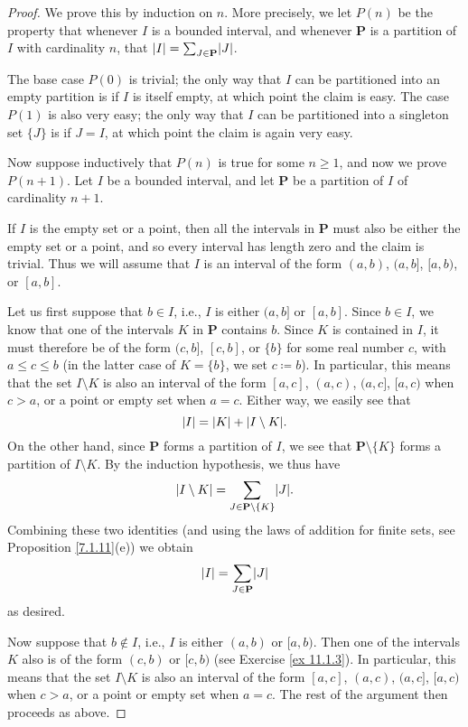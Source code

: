 \begin{proof}
    We prove this by induction on \(n\).
    More precisely, we let \(P(n)\) be the property that whenever \(I\) is a bounded interval, and whenever \(\mathbf{P}\) is a partition of \(I\) with cardinality \(n\), that \(\abs*{I} = \sum_{J \in \mathbf{P}} \abs*{J}\).

    The base case \(P(0)\) is trivial;
    the only way that \(I\) can be partitioned into an empty partition is if \(I\) is itself empty, at which point the claim is easy.
    The case \(P(1)\) is also very easy;
    the only way that \(I\) can be partitioned into a singleton set \(\{J\}\) is if \(J = I\), at which point the claim is again very easy.

    Now suppose inductively that \(P(n)\) is true for some \(n \geq 1\), and now we prove \(P(n + 1)\).
    Let \(I\) be a bounded interval, and let \(\mathbf{P}\) be a partition of \(I\) of cardinality \(n + 1\).

    If \(I\) is the empty set or a point, then all the intervals in \(\mathbf{P}\) must also be either the empty set or a point, and so every interval has length zero and the claim is trivial.
    Thus we will assume that \(I\) is an interval of the form \((a, b)\), \((a, b]\), \([a, b)\), or \([a, b]\).

            Let us first suppose that \(b \in I\), i.e., \(I\) is either \((a, b]\) or \([a, b]\).
    Since \(b \in I\), we know that one of the intervals \(K\) in \(\mathbf{P}\) contains \(b\).
    Since \(K\) is contained in \(I\), it must therefore be of the form \((c, b]\), \([c, b]\), or \(\{b\}\) for some real number \(c\), with \(a \leq c \leq b\) (in the latter case of \(K = \{b\}\), we set \(c \coloneqq b\)).
    In particular, this means that the set \(I \setminus K\) is also an interval of the form \([a, c]\), \((a, c)\), \((a, c]\), \([a, c)\) when \(c > a\), or a point or empty set when \(a = c\).
    Either way, we easily see that
    \[
        \abs*{I} = \abs*{K} + \abs*{I \setminus K}.
    \]
    On the other hand, since \(\mathbf{P}\) forms a partition of \(I\), we see that \(\mathbf{P} \setminus \{K\}\) forms a partition of \(I \setminus K\).
    By the induction hypothesis, we thus have
    \[
        \abs*{I \setminus K} = \sum_{J \in \mathbf{P} \setminus \{K\}} \abs*{J}.
    \]
    Combining these two identities (and using the laws of addition for finite sets, see Proposition \ref{7.1.11}(e)) we obtain
    \[
        \abs*{I} = \sum_{J \in \mathbf{P}} \abs*{J}
    \]
    as desired.

    Now suppose that \(b \notin I\), i.e., \(I\) is either \((a, b)\) or \([a, b)\).
    Then one of the intervals \(K\) also is of the form \((c, b)\) or \([c, b)\) (see Exercise \ref{ex 11.1.3}).
            In particular, this means that the set \(I \setminus K\) is also an interval of the form \([a, c]\), \((a, c)\), \((a, c]\), \([a, c)\) when \(c > a\), or a point or empty set when \(a = c\).
    The rest of the argument then proceeds as above.
\end{proof}

